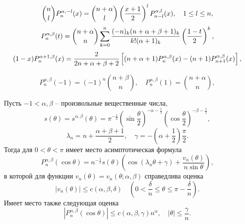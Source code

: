  \begin{equation}\label{sobleg-2.6}
 {n\choose l}P_n^{\alpha,-l}(x)= {n+\alpha\choose
l}\left({x+1\over2}\right)^lP_{n-l}^{\alpha,l}(x),
     \quad 1\le l \le n,
\end{equation}
\begin{equation}\label{sobleg-2.7}
P_n^{\alpha,\beta}(t) ={n+\alpha\choose n}
\sum_{k=0}^n{(-n)_k(n+\alpha+\beta+1)_k\over k!(\alpha+1)_k}
\left({1-t\over 2}\right)^k,
\end{equation}
\begin{equation}\label{sobleg-2.8}
(1-x)P_n^{\alpha+1,\beta}(x)={2\over2n+\alpha+\beta+2}
\left[(n+ \alpha+1)P_n^{\alpha,\beta}(x)-
(n+1)P_{n+1}^{\alpha,\beta}(x)\right],
\end{equation}

\begin{equation}\label{sobleg-2.9}
P_n^{\alpha,\beta}(-1)=(-1)^n {n+\beta\choose n},\quad P_n^{\alpha,\beta}(1)= {n+\alpha\choose n},
\end{equation}


Пусть $-1<\alpha, \beta$ -- произвольные вещественные числа,
$$
s(\theta)=s^{\alpha,\beta}(\theta)=\pi^{-\frac12}
\left(\sin\frac{\theta}{2}\right)^{-\alpha-\frac12}
\left(\cos\frac{\theta}{2}\right)^{-\beta-\frac12},
$$
$$
\lambda_n=n+\frac{\alpha+\beta+1}{2}, \quad\gamma=-
\left(\alpha+\frac{1}{2}\right)\frac{\pi}{2}.
$$
Тогда для $0<\theta<\pi$ имеет место асимптотическая формула
\begin{equation}\label{sobleg-2.10}
P_n^{\alpha,\beta}(\cos\theta)=n^{-\frac12}s(\theta)
\left(\cos(\lambda_n\theta+\gamma)+
\frac{v_n(\theta)}{n\sin\theta}\right),
\end{equation}
в которой для функции $v_n(\theta)=v_n(\theta;\alpha,\beta)$
справедлива оценка
\begin{equation}\label{sobleg-2.11}
|v_n(\theta)|\le c(\alpha,\beta,\delta)\quad
 \left(0<\frac{\delta}{n}\le\theta\le\pi-\frac{\delta}{n}\right).
\end{equation}
Имеет место также следующая оценка
\begin{equation}\label{sobleg-2.12}
|P_n^{\alpha,\beta}(\cos\theta)|\le c(\alpha,\beta,\gamma)n^\alpha, \quad |\theta|\le \frac{\gamma}{n}.
\end{equation}

